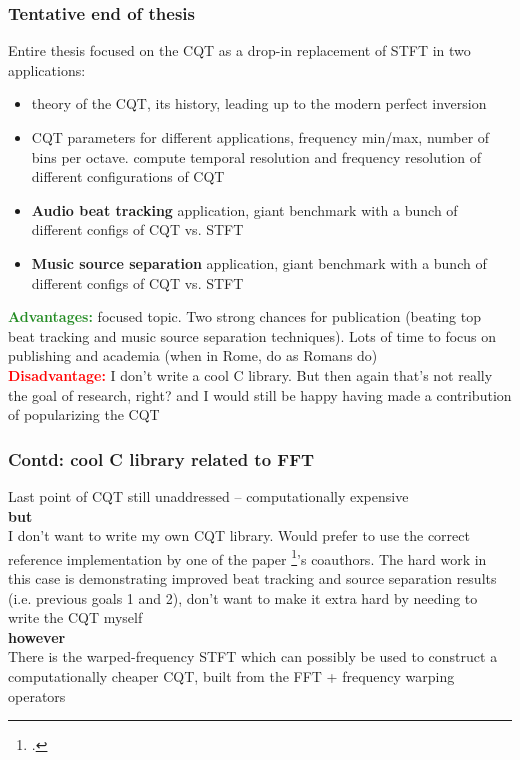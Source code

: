 \documentclass[usenames,dvipsnames]{beamer}
\begin{document}
\begin{frame}
	\frametitle{Tentative end of thesis}
	Entire thesis focused on the CQT as a drop-in replacement of STFT in two applications:
	\begin{itemize}
		\item
			theory of the CQT, its history, leading up to the modern perfect inversion
		\item
			CQT parameters for different applications, frequency min/max, number of bins per octave. compute temporal resolution and frequency resolution of different configurations of CQT
		\item
			\textbf{Audio beat tracking} application, giant benchmark with a bunch of different configs of CQT vs. STFT
		\item
			\textbf{Music source separation} application, giant benchmark with a bunch of different configs of CQT vs. STFT
	\end{itemize}
	\textcolor{ForestGreen}{\textbf{Advantages:}} focused topic. Two strong chances for publication (beating top beat tracking and music source separation techniques). Lots of time to focus on publishing and academia (when in Rome, do as Romans do)\\
	\textcolor{red}{\textbf{Disadvantage:}} I don't write a cool C library. But then again that's not really the goal of research, right? and I would still be happy having made a contribution of popularizing the CQT
\end{frame}

\begin{frame}
	\frametitle{Contd: cool C library related to FFT}
	Last point of CQT still unaddressed -- computationally expensive\\
	\vspace{1em}
	\textbf{but}\\
	I don't want to write my own CQT library. Would prefer to use the correct reference implementation by one of the paper \footcite{invertiblecqt}'s coauthors. The hard work in this case is demonstrating improved beat tracking and source separation results (i.e. previous goals 1 and 2), don't want to make it extra hard by needing to write the CQT myself\\
	\vspace{1em}
	\textbf{however}\\
	There is the warped-frequency STFT which can possibly be used to construct a computationally cheaper CQT, built from the FFT + frequency warping operators
\end{frame}
\end{document}
